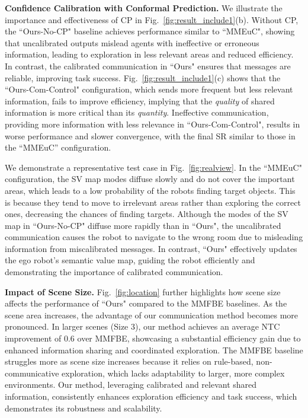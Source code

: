  
\textbf{Confidence Calibration with Conformal Prediction.} 
We illustrate the importance and effectiveness of CP in Fig.~\ref{fig:result_include1}(b). 
Without CP, the ``Ours-No-CP" baseline achieves performance similar to ``MMEuC", showing that uncalibrated outputs mislead agents with ineffective or erroneous information, leading to exploration in less relevant areas and reduced efficiency. In contrast, the calibrated communication in ``Ours" ensures that messages are reliable, improving task success.
Fig.~\ref{fig:result_include1}(c) shows that the ``Ours-Com-Control" configuration, which sends more frequent but less relevant information, fails to improve efficiency, implying that the \textit{quality} of shared information is more critical than its \textit{quantity}. Ineffective communication, providing more information with less relevance in ``Ours-Com-Control", results in worse performance and slower convergence, with the final SR similar to those in the ``MMEuC'' configuration.

We demonstrate a representative test case in Fig.~\ref{fig:realview}. In the ``MMEuC" configuration, the SV map modes diffuse slowly and do not cover the important areas, which leads to a low probability of the robots finding target objects. This is because they tend to move to irrelevant areas rather than exploring the correct ones, decreasing the chances of finding targets. Although the modes of the SV map in ``Ours-No-CP" diffuse more rapidly than in ``Ours", the uncalibrated communication causes the robot to navigate to the wrong room due to misleading information from miscalibrated messages. In contrast, ``Ours" effectively updates the ego robot's semantic value map, guiding the robot efficiently and demonstrating the importance of calibrated communication.


\textbf{Impact of Scene Size.} Fig.~\ref{fig:location} further highlights how scene size affects the performance of ``Ours" compared to the MMFBE baselines. As the scene area increases, the advantage of our communication method becomes more pronounced. In larger scenes (Size 3), our method achieves an average NTC improvement of 0.6 over MMFBE, showcasing a substantial efficiency gain due to enhanced information sharing and coordinated exploration. 
The MMFBE baseline struggles more as scene size increases because it relies on rule-based, non-communicative exploration, which lacks adaptability to larger, more complex environments. 
Our method, leveraging calibrated and relevant shared information, consistently enhances exploration efficiency and task success, which demonstrates its robustness and scalability.

